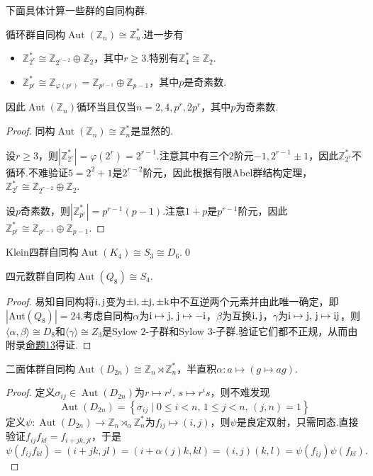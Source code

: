 下面具体计算一些群的自同构群.
\begin{prop}
	循环群自同构$\operatorname*{Aut}(\mathbb{Z}_n)\cong\mathbb{Z}_n^*$.进一步有
	\begin{itemize}
		\item $\mathbb{Z}_{2^r}^*\cong\mathbb{Z}_{2^{r-2}}\oplus\mathbb{Z}_2$，其中$r\ge 3$.特别有$\mathbb{Z}_4^*\cong\mathbb{Z}_2$.
		\item $\mathbb{Z}_{p^r}^*\cong\mathbb{Z}_{\varphi(p^r)}=\mathbb{Z}_{p^{r-1}}\oplus\mathbb{Z}_{p-1}$，其中$p$是奇素数.
	\end{itemize}
	因此$\operatorname*{Aut}(\mathbb{Z}_n)$循环当且仅当$n=2,4,p^r,2p^r$，其中$p$为奇素数.\hypertarget{prop:CyclicAuto}{}
\end{prop}
\begin{proof}
	同构$\operatorname*{Aut}(\mathbb{Z}_n)\cong\mathbb{Z}_n^*$是显然的.

	设$r\ge 3$，则$|\mathbb{Z}_{2^r}^*|=\varphi(2^r)=2^{r-1}$.注意其中有三个$2$阶元$-1,2^{r-1}\pm 1$，因此$\mathbb{Z}_{2^r}^*$不循环.不难验证$5=2^2+1$是$2^{r-2}$阶元，因此根据有限Abel群结构定理，$\mathbb{Z}_{2^r}^*\cong\mathbb{Z}_{2^{r-2}}\oplus\mathbb{Z}_2$.

	设$p$奇素数，则$|\mathbb{Z}_{p^r}^*|=p^{r-1}(p-1)$.注意$1+p$是$p^{r-1}$阶元，因此$\mathbb{Z}_{p^r}^*\cong\mathbb{Z}_{p^{r-1}}\oplus\mathbb{Z}_{p-1}$.
\end{proof}
\begin{prop}
	Klein四群自同构$\operatorname*{Aut}(K_4)\cong S_3\cong D_6$.\qed
\end{prop}
\begin{prop}
	四元数群自同构$\operatorname*{Aut}(Q_8)\cong S_4$.
\end{prop}
\begin{proof}
	易知自同构将$\mathrm{i},\mathrm{j}$变为$\pm \mathrm{i},\pm\mathrm{j},\pm\mathrm{k}$中不互逆两个元素并由此唯一确定，即$|\mathrm{Aut}(Q_8)|=24$.考虑自同构$\alpha$为$\mathrm{i}\mapsto\mathrm{j},\,\mathrm{j}\mapsto-\mathrm{i}$，$\beta$为互换$\mathrm{i},\mathrm{j}$，$\gamma$为$\mathrm{i}\mapsto\mathrm{j},\,\mathrm{j}\mapsto\mathrm{i}\mathrm{j}$，则$\langle \alpha,\beta\rangle\cong D_8$和$\langle \gamma\rangle\cong Z_3$是Sylow $2$-子群和Sylow $3$-子群.验证它们都不正规，从而由附录\hyperlink{prop:24OrderGroup}{命题13}得证.
\end{proof}
\begin{prop}
	二面体群自同构$\operatorname*{Aut}(D_{2n})\cong\mathbb{Z}_n\rtimes\mathbb{Z}_n^*$，半直积$\alpha\colon a\mapsto(g\mapsto ag)$.
\end{prop}
\begin{proof}
	定义$\sigma_{ij}\in\operatorname*{Aut}(D_{2n})$为$r\mapsto r^j,\,s\mapsto r^is$，则不难发现
	\[
		\operatorname*{Aut}(D_{2n})=\left\{\sigma_{ij}\mid 0\le i<n,\,1\le j<n,\,(j,n)=1\right\}
	\]
	定义$\psi\colon\operatorname*{Aut}(D_{2n})\to\mathbb{Z}_n\rtimes_\alpha\mathbb{Z}_n^*$为$f_{ij}\mapsto(i,j)$，则$\psi$是良定双射，只需同态.直接验证$f_{ij}f_{kl}=f_{i+jk,jl}$，于是
	\[
		\psi(f_{ij}f_{kl})=(i+jk,jl)=(i+\alpha(j)k,kl)=(i,j)(k,l)=\psi(f_{ij})\psi(f_{kl}).
	\]
\end{proof}

